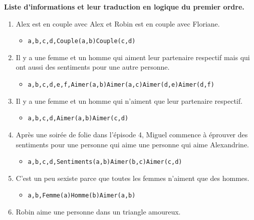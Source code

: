 \documentclass[Arial, 11pt]{article}
\begin{document}
\textbf{Liste d'informations et leur traduction en logique du premier ordre.}
\begin{enumerate}
    \item Alex est en couple avec Alex et Robin est en couple avec Floriane.
    \begin{itemize}
        \item \begin{alltt}\exists a,b,c,d, Couple(a,b) \bigwedge Couple(c,d)\end{alltt}
    \end{itemize}
    \item Il y a une femme et un homme qui aiment leur partenaire respectif mais qui ont aussi des sentiments pour une autre personne.
    \begin{itemize}
        \item \begin{alltt}\exists a,b,c,d,e,f, Aimer(a,b) \bigwedge Aimer(a,c) \bigwedge Aimer(d,e) \bigwedge Aimer(d,f)\end{alltt}
    \end{itemize}
    \item Il y a une femme et un homme qui n’aiment que leur partenaire respectif.
    \begin{itemize}
        \item \begin{alltt}\exists a,b,c,d, Aimer(a,b) \bigwedge Aimer(c,d)\end{alltt}
    \end{itemize}
    \item Après une soirée de folie dans l’épisode 4, Miguel commence à éprouver des sentiments pour une personne qui aime une personne qui aime Alexandrine.
    \begin{itemize}
        \item \begin{alltt}\exists a,b,c,d, Sentiments(a,b) \bigwedge Aimer(b,c) \bigwedge Aimer(c,d)\end{alltt}
    \end{itemize}
    \item C’est un peu sexiste parce que toutes les femmes n’aiment que des hommes.
    \begin{itemize}
        \item \begin{alltt}\forall a,b, Femme(a) \bigwedge Homme(b) \to Aimer(a,b) \end{alltt}
    \end{itemize}
    \item Robin aime une personne dans un triangle amoureux.

\end{enumerate}
\end{document}
